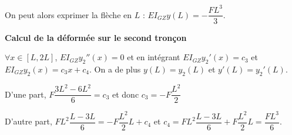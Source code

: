 \begin{corrigebox}
On peut alors exprimer la flèche en $L$ : $EI_{GZ}y(L)= -\dfrac{ FL^3}{3}$.

\textbf{Calcul de la déformée sur le second tronçon}

$\forall x \in [L,2L]$, $EI_{GZ}y_2''(x)=0$ et en intégrant $EI_{GZ}y_2'(x)=c_3$ et $EI_{GZ}y_2(x)=c_3x + c_4$. 
On a de plus $y(L) = y_2(L)$ et $y'(L) = y_2'(L)$. 

D'une part, $F\dfrac{3L^2- 6L^2}{6}=c_3 $ et donc $c_3 =  -F\dfrac{ L^2}{2} $

D'autre part, $FL^2\dfrac{L - 3L}{6}=-F\dfrac{ L^2}{2} L + c_4$ et $c_4 =  FL^2\dfrac{L - 3L}{6}+F\dfrac{ L^2}{2} L  = \dfrac{FL^3}{6}$.
\par\medskip\begin{center}\captionsetup{type=figure}
\centering

\end{center}\par\medskip
\end{corrigebox}
